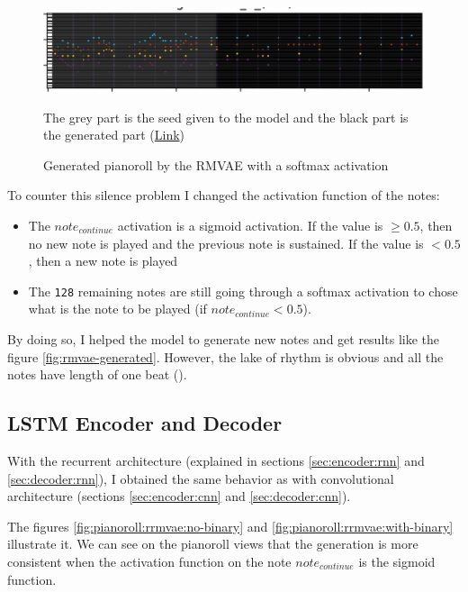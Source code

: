 \documentclass[12pt]{report}
\begin{document}
\begin{figure}[htbp]
    \centering
    \includegraphics[width=\textwidth]{images/generated_midis/RMVAE/cnn_generation_silence.jpg}
    \caption{Generated pianoroll by the RMVAE with a softmax activation}
    The grey part is the seed given to the model and the black part is the generated part
    (\href{https://github.com/ValentinVignal/midiGenerator/blob/master/samples/results/generated_silence.mid}{Link})
    \label{fig:rmvae-generated-silence}
\end{figure}

To counter this silence problem I changed the activation function of the notes:
\begin{itemize}
    \item The $note_{continue}$ activation is a sigmoid activation.
    If the value is $\geq 0.5$, then no new note is played and the previous note is sustained.
    If the value is $< 0.5$, then a new note is played
    \item The \texttt{128} remaining notes are still going through a softmax activation to chose what is the note to be played (if $note_{continue} <0.5$).
\end{itemize}

By doing so, I helped the model to generate new notes and get results like the figure \ref{fig:rmvae-generated}.
However, the lake of rhythm is obvious and all the notes have length of one beat (\musQuarter).


\subsection{LSTM Encoder and Decoder}

With the recurrent architecture (explained in sections \ref{sec:encoder:rnn} and \ref{sec:decoder:rnn}), I obtained the same behavior as with convolutional architecture (sections \ref{sec:encoder:cnn} and \ref{sec:decoder:cnn}).

The figures \ref{fig:pianoroll:rrmvae:no-binary} and \ref{fig:pianoroll:rrmvae:with-binary} illustrate it.
We can see on the pianoroll views that the generation is more consistent when the activation function on the note $note_{continue}$ is the sigmoid function.
\end{document}
